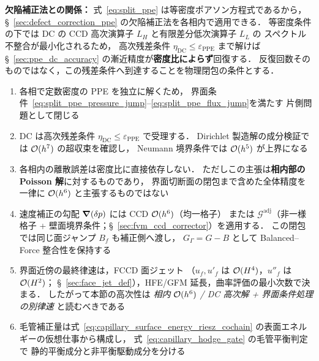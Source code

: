 \noindent\textbf{欠陥補正法との関係：}
式~\eqref{eq:split_ppe} は等密度ポアソン方程式であるから，
§~\ref{sec:defect_correction_ppe} の欠陥補正法を各相内で適用できる．
等密度条件の下では DC の CCD 高次演算子 $L_H$ と有限差分低次演算子 $L_L$ の
スペクトル不整合が最小化されるため，
高次残差条件 $\eta_{\mathrm{DC}}\le\varepsilon_{\mathrm{PPE}}$ まで解けば
§~\ref{sec:ppe_dc_accuracy} の漸近精度が\textbf{密度比によらず}回復する．
反復回数そのものではなく，この残差条件へ到達することを物理閉包の条件とする．

\begin{tcolorbox}[resultbox, title={分相 PPE + DC 残差受理条件の相内精度と界面律速}]
\begin{enumerate}[noitemsep]
  \item 各相で定数密度の PPE を独立に解くため，
        界面条件~\eqref{eq:split_ppe_pressure_jump}--\eqref{eq:split_ppe_flux_jump}を満たす
        片側問題として閉じる
  \item DC は高次残差条件
        $\eta_{\mathrm{DC}}\le\varepsilon_{\mathrm{PPE}}$ で受理する．
        Dirichlet 製造解の成分検証では $\mathcal{O}(h^7)$ の超収束を確認し，
        Neumann 境界条件では $\mathcal{O}(h^5)$ が上界になる
  \item 各相内の離散誤差は密度比に直接依存しない．
        ただしこの主張は\textbf{相内部の Poisson 解}に対するものであり，
        界面切断面の閉包まで含めた全体精度を一律に $\mathcal{O}(h^6)$ と主張するものではない
  \item 速度補正の勾配 $\bm{\nabla}(\delta p)$ には CCD $\mathcal{O}(h^6)$（均一格子）
        または $\mathcal{G}^\text{adj}$（非一様格子 + 壁面境界条件；§~\ref{sec:fvm_ccd_corrector}）を適用する．
        この閉包では同じ面ジャンプ $B_f$ も補正側へ渡し，
        $G_\Gamma=G-B$ として Balanced--Force 整合性を保持する
  \item 界面近傍の最終律速は，FCCD 面ジェット
        （$u_f,u'_f$ は $\mathcal{O}(H^4)$，$u''_f$ は $\mathcal{O}(H^2)$；
        §~\ref{sec:face_jet_def}），HFE/GFM 延長，曲率評価の最小次数で決まる．
        したがって本節の高次性は
        \emph{相内 $\mathcal{O}(h^6)$ / DC 高次解 + 界面条件処理の別律速}
        と読むべきである
  \item 毛管補正量は式~\eqref{eq:capillary_surface_energy_riesz_cochain}
        の表面エネルギーの仮想仕事から構成し，
        式~\eqref{eq:capillary_hodge_gate} の毛管平衡判定で
        静的平衡成分と非平衡駆動成分を分ける
\end{enumerate}
\end{tcolorbox}

